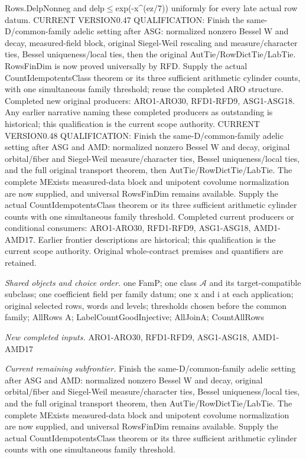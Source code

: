 \documentclass[11pt,a4paper]{article}
\numberwithin{equation}{section}
\theoremstyle{remark}\newtheorem{remark}[theorem]{Remark}
\begin{document}
Rows.DelpNonneg and delp$\le$exp(-x\textasciicircum{}(ez/7)) uniformly for every late actual row datum. CURRENT VERSION0.47 QUALIFICATION: Finish the same-D/common-family adelic setting after ASG: normalized nonzero Bessel W and decay, measured-field block, original Siegel-Weil rescaling and measure/character ties, Bessel uniqueness/local ties, then the original AutTie/RowDictTie/LabTie. RowsFinDim is now proved universally by RFD. Supply the actual CountIdempotentsClass theorem or its three sufficient arithmetic cylinder counts, with one simultaneous family threshold; reuse the completed ARO structure. Completed new original producers: ARO1-ARO30, RFD1-RFD9, ASG1-ASG18. Any earlier narrative naming these completed producers as outstanding is historical; this qualification is the current scope authority. CURRENT VERSION0.48 QUALIFICATION: Finish the same-D/common-family adelic setting after ASG and AMD: normalized nonzero Bessel W and decay, original orbital/fiber and Siegel-Weil measure/character ties, Bessel uniqueness/local ties, and the full original transport theorem, then AutTie/RowDictTie/LabTie. The complete MExists measured-data block and unipotent covolume normalization are now supplied, and universal RowsFinDim remains available. Supply the actual CountIdempotentsClass theorem or its three sufficient arithmetic cylinder counts with one simultaneous family threshold. Completed current producers or conditional consumers: ARO1-ARO30, RFD1-RFD9, ASG1-ASG18, AMD1-AMD17. Earlier frontier descriptions are historical; this qualification is the current scope authority. Original whole-contract premises and quantifiers are retained.

\emph{Shared objects and choice order.} one FamP; one class $\mathcal A$ and its target-compatible subclass; one coefficient field per family datum; one x and i at each application; original selected rows, words and levels; thresholds chosen before the common family; AllRows A; LabelCountGoodInjective; AllJoinA; CountAllRows

\emph{New completed inputs.} ARO1-ARO30, RFD1-RFD9, ASG1-ASG18, AMD1-AMD17

\emph{Current remaining subfrontier.} Finish the same-D/common-family adelic setting after ASG and AMD: normalized nonzero Bessel W and decay, original orbital/fiber and Siegel-Weil measure/character ties, Bessel uniqueness/local ties, and the full original transport theorem, then AutTie/RowDictTie/LabTie. The complete MExists measured-data block and unipotent covolume normalization are now supplied, and universal RowsFinDim remains available. Supply the actual CountIdempotentsClass theorem or its three sufficient arithmetic cylinder counts with one simultaneous family threshold.
\end{document}
